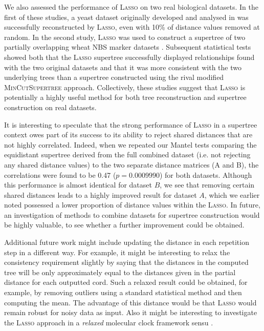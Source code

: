 We also assessed the performance of \textsc{Lasso} on two real biological
datasets. In the first of these studies, a yeast dataset originally developed
and analysed in \cite{west14ribosomal} was successfully reconstructed by
\textsc{Lasso}, even with 10\% of distance values removed at random. In the
second study, \textsc{Lasso} was used to construct a supertree of two
partially overlapping wheat NBS marker datasets \cite{gediflux,
  muge}. Subsequent statistical tests showed both that the \textsc{Lasso}
supertree successfully displayed relationships found with the two original
datasets and that it was more consistent with the two underlying trees than a
supertree constructed using the rival modified \textsc{MinCutSupertree}
approach. Collectively, these studies suggest that \textsc{Lasso} is
potentially a highly useful method for both tree reconstruction and supertree
construction on real datasets.

It is interesting to speculate that the strong performance of \textsc{Lasso}
in a supertree context owes part of its success to its ability to reject
shared distances that are not highly correlated. Indeed, when we repeated our
Mantel tests comparing the equidistant supertree derived from the full
combined dataset (i.e. not rejecting any shared distance values) to the two
separate distance matrices (A and B), the correlations were found to be 0.47
($p = 0.0009990$) for both datasets. Although this performance is almost
identical for dataset $B$, we see that removing certain shared distances leads
to a highly improved result for dataset $A$, which we earlier noted possessed
a lower proportion of distance values within the \textsc{Lasso}.  In future,
an investigation of methods to combine datasets for supertree construction
would be highly valuable, to see whether a further improvement could be
obtained.

Additional future work might include updating the distance in each repetition
step in a different way.  For example, it might be interesting to relax the
consistency requirement slightly by saying that the distances in the computed
tree will be only approximately equal to the distances given in the partial
distance for each outputted cord.  Such a relaxed result could be obtained,
for example, by removing outliers using a standard statistical method and then
computing the mean.  The advantage of this distance would be that \textsc{Lasso}
would remain robust for noisy data as input. Also it might be interesting to
investigate the \textsc{Lasso} approach in a {\em relaxed} molecular clock
framework sensu \cite{drummond06relaxed}.

